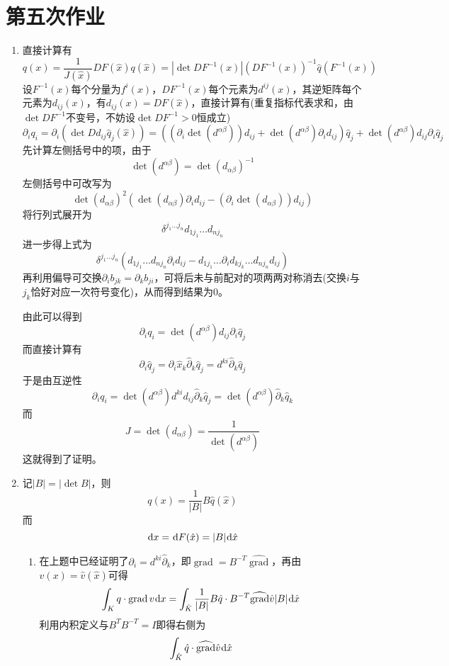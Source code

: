 \documentclass[a4paper,UTF8,fontset=windows,10pt]{ctexart}
\newcommand*{\dr}{\hspace{0.07em}\mathrm{d}}
\DeclareMathOperator*{\grad}{grad}
\begin{document}
\section{第五次作业}
\begin{enumerate}
    \item 
    直接计算有
    $$q(x)=\frac{1}{J(\hat{x})}DF(\hat{x})q(\hat{x})=|\det DF^{-1}(x)|(DF^{-1}(x))^{-1}\hat{q}(F^{-1}(x))$$
    设$F^{-1}(x)$每个分量为$f^i(x)$，$DF^{-1}(x)$每个元素为$d^{ij}(x)$，其逆矩阵每个元素为$d_{ij}(x)$，有$d_{ij}(x)=DF(\hat{x})$，直接计算有(重复指标代表求和，由$\det DF^{-1}$不变号，不妨设$\det DF^{-1}>0$恒成立)
    $$\partial_iq_i=\partial_i(\det Dd_{ij}\hat{q}_j(\hat{x}))=((\partial_i\det(d^{\alpha\beta}))d_{ij}+\det(d^{\alpha\beta})\partial_id_{ij})\hat{q}_j+\det(d^{\alpha\beta})d_{ij}\partial_i\hat{q}_j$$
    先计算左侧括号中的项，由于
    $$\det(d^{\alpha\beta})=\det(d_{\alpha\beta})^{-1}$$
    左侧括号中可改写为
    $$\det(d_{\alpha\beta})^2(\det(d_{\alpha\beta})\partial_id_{ij}-(\partial_i\det(d_{\alpha\beta}))d_{ij})$$
    将行列式展开为
    $$\delta^{j_1\dots j_n}d_{1j_1}\dots d_{nj_n}$$
    进一步得上式为
    $$\delta^{j_1\dots j_n}(d_{1j_1}\dots d_{nj_n}\partial_id_{ij}-d_{1j_1}\dots\partial_id_{kj_k}\dots d_{nj_n}d_{ij})$$
    再利用偏导可交换$\partial_ib_{jk}=\partial_kb_{ji}$，可将后未与前配对的项两两对称消去(交换$i$与$j_k$恰好对应一次符号变化)，从而得到结果为0。

    由此可以得到
    $$\partial_iq_i=\det(d^{\alpha\beta})d_{ij}\partial_i\hat{q}_j$$
    而直接计算有
    $$\partial_i\hat{q}_j=\partial_i\hat{x}_k\hat{\partial}_k\hat{q}_j=d^{ki}\hat{\partial}_k\hat{q}_j$$
    于是由互逆性
    $$\partial_iq_i=\det(d^{\alpha\beta})d^{ki}d_{ij}\hat{\partial}_k\hat{q}_j=\det(d^{\alpha\beta})\hat{\partial}_k\hat{q}_k$$
    而
    $$J=\det(d_{\alpha\beta})=\frac{1}{\det(d^{\alpha\beta})}$$
    这就得到了证明。

    \item
    记$|B|=|\det B|$，则
    $$q(x)=\frac{1}{|B|}B\hat{q}(\hat{x})$$
    而
    $$\dr x=\dr F(\hat{x})=|B|\dr\hat{x}$$
    \begin{enumerate}[(1)]
        \item 在上题中已经证明了$\partial_i=d^{ki}\hat{\partial}_k$，即$\grad=B^{-T}\widehat{\grad}$，再由$v(x)=\hat{v}(\hat{x})$可得
        $$\int_Kq\cdot\grad v\dr x=\int_{\hat{K}}\frac{1}{|B|}B\hat{q}\cdot B^{-T}\widehat{\grad}\hat{v}|B|\dr\hat{x}$$
        利用内积定义与$B^TB^{-T}=I$即得右侧为
        $$\int_{\hat{K}}\hat{q}\cdot\widehat{\grad}\hat{v}\dr\hat{x}$$


\end{enumerate}
\end{enumerate}
\end{document}
